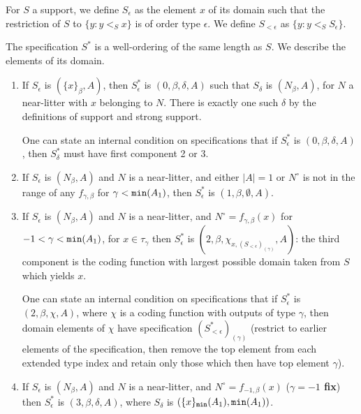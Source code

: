\documentclass[112pt]{article}
\begin{document}
\begin{description}
For $S$ a support, we define $S_\epsilon$ as the element $x$ of its domain such that the restriction of $S$ to $\{y:y <_S x\}$ is of order type $\epsilon$.  We define
$S_{<\epsilon}$ as $\{y:y <_S S_\epsilon\}$.

The specification $S^*$ is a well-ordering of the same length as $S$.  We describe the elements of its domain.

\begin{enumerate}

\item  If $S_{\epsilon}$ is $(\{x\}_\beta,A)$, then $S^*_\epsilon$ is $(0,\beta,\delta,A)$ such that $S_\delta$ is $(N_\beta,A)$, for $N$ a near-litter with $x$ belonging to $N$.  There is exactly one such $\delta$ by the definitions of support and strong support.

One can state an internal condition on specifications that if $S^*_\epsilon$ is $(0,\beta,\delta,A)$, then $S^*_\delta$ must have first component 2 or 3.

\item  If $S_\epsilon$ is $(N_\beta,A)$ and $N$ is a near-litter, and either $|A|=1$ or $N^\circ$ is not in the range of any $f_{\gamma,\beta}$ for $\gamma<{\tt min}(A_1)$, then $S^*_\epsilon$ is $(1,\beta,\emptyset,A)$.

\item  If $S_\epsilon$ is $(N_\beta,A)$ and $N$ is a near-litter, and $N^\circ=f_{\gamma,\beta}(x)$ for $-1<\gamma<{\tt min}(A_1)$, for $x\in \tau_\gamma$ then 
$S^*_\epsilon$ is $(2,\beta,\chi_{x,(S_{<\epsilon})_{(\gamma)}},A)$:  the third component is the coding function with largest possible domain taken from $S$ which yields $x$.

One can state an internal condition on specifications that if $S^*_\epsilon$ is $(2,\beta,\chi,A)$, where $\chi$ is a coding function with outputs of type
$\gamma$, then domain elements of $\chi$ have specification $(S^*_{<\epsilon})_{(\gamma)}$ (restrict to earlier elements of the specification, then remove the top element from each extended type index and retain only those which then have top element $\gamma$).

\item  If $S_\epsilon$ is $(N_\beta,A)$ and $N$ is a near-litter, and $N^\circ=f_{-1,\beta}(x)$ ({\bf $\gamma = -1$ fix}) then $S^*_\epsilon$ is $(3,\beta,\delta,A)$, where  $S_\delta$ is $(\{x\}_{\tt min}(A_1),{\tt min}(A_1))$.

\end{enumerate}


\end{description}
\end{document}
